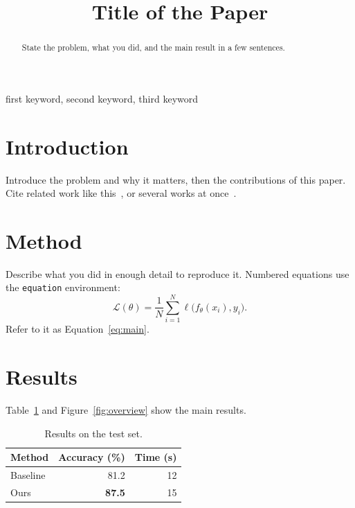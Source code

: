 \documentclass[conference,compsoc]{IEEEtran}
\begin{document}
\title{Title of the Paper}

\author{
\and
{}
}

\maketitle

\begin{abstract}
State the problem, what you did, and the main result in a few sentences.
\end{abstract}

\begin{IEEEkeywords}
first keyword, second keyword, third keyword
\end{IEEEkeywords}

\section{Introduction}
\label{sec:intro}
Introduce the problem and why it matters, then the contributions of this
paper. Cite related work like this~\cite{he2016deep}, or several works at
once~\cite{he2016deep,vaswani2017attention}.

\section{Method}
\label{sec:method}
Describe what you did in enough detail to reproduce it. Numbered equations use
the \texttt{equation} environment:
\begin{equation}
  \label{eq:main}
  \mathcal{L}(\theta) = \frac{1}{N} \sum_{i=1}^{N} \ell\bigl(f_\theta(x_i), y_i\bigr).
\end{equation}
Refer to it as Equation~\eqref{eq:main}.

\section{Results}
\label{sec:results}
Table~\ref{tab:results} and Figure~\ref{fig:overview} show the main results.

\begin{table}[htbp]
  \centering
  \caption{Results on the test set.}
  \label{tab:results}
  \begin{tabular}{lrr}
    \toprule
    Method & Accuracy (\%) & Time (s) \\
    \midrule
    Baseline & 81.2 & 12 \\
    Ours & \textbf{87.5} & 15 \\
    \bottomrule
  \end{tabular}
\end{table}
\end{document}
